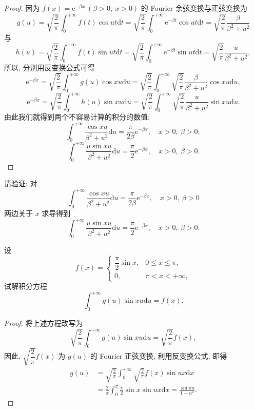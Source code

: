 \begin{proof}
因为 $f(x)=\mathrm{e}^{-\beta x}\ (\beta>0,\ x>0)$ 的 Fourier 余弦变换与正弦变换为
\[
  g(u)=\sqrt{\frac{2}{\pi}}\int_{0}^{+\infty}f(t)\cos ut\mathrm{d}t=\sqrt{\frac{2}{\pi}}\int_{0}^{+\infty}\mathrm{e}^{-\beta t}\cos ut\mathrm{d}t=\sqrt{\frac{2}{\pi}}\frac{\beta}{\beta^{2}+u^{2}}
\]
与
\[
  h(u)=\sqrt{\frac{2}{\pi}}\int_{0}^{+\infty}f(t)\sin ut\mathrm{d}t=\sqrt{\frac{2}{\pi}}\int_{0}^{+\infty}\mathrm{e}^{-\beta t}\sin ut\mathrm{d}t=\sqrt{\frac{2}{\pi}}\frac{u}{\beta^{2}+u^{2}},
\]
所以, 分别用反变换公式可得
\[
  \mathrm{e}^{-\beta x}=\sqrt{\frac{2}{\pi}}\int_{0}^{+\infty}g(u)\cos xu\mathrm{d}u=\sqrt{\frac{2}{\pi}}\int_{0}^{+\infty}\sqrt{\frac{2}{\pi}}\frac{\beta}{\beta^{2}+u^{2}}\cos xu\mathrm{d}u,
\]
\[
  \mathrm{e}^{-\beta x}=\sqrt{\frac{2}{\pi}}\int_{0}^{+\infty}h(u)\sin xu\mathrm{d}u=\sqrt{\frac{2}{\pi}}\int_{0}^{+\infty}\sqrt{\frac{2}{\pi}}\frac{u}{\beta^{2}+u^{2}}\sin xu\mathrm{d}u.
\]
由此我们就得到两个不容易计算的积分的数值:
\[
  \int_{0}^{+\infty}\frac{\cos xu}{\beta^{2}+u^{2}}\mathrm{d}u=\frac{\pi}{2\beta}\mathrm{e}^{-\beta x},\quad x>0,\ \beta>0;
\]
\[
  \int_{0}^{+\infty}\frac{u\sin xu}{\beta^{2}+u^{2}}\mathrm{d}u=\frac{\pi}{2}\mathrm{e}^{-\beta x},\quad x>0,\ \beta>0.
\]
\end{proof}

\begin{remark}\label{rem:16.3.1}
请验证: 对
\[
  \int_{0}^{+\infty}\frac{\cos xu}{\beta^{2}+u^{2}}\mathrm{d}u=\frac{\pi}{2\beta}\mathrm{e}^{-\beta x},\quad x>0,\ \beta>0
\]
两边关于 $x$ 求导得到
\[
  \int_{0}^{+\infty}\frac{u\sin xu}{\beta^{2}+u^{2}}\mathrm{d}u=\frac{\pi}{2}\mathrm{e}^{-\beta x},\quad x>0,\ \beta>0.
\]
\end{remark}

\begin{example}\label{ex:16.3.3}
设
\[
  f(x)=\begin{cases}
    \dfrac{\pi}{2}\sin x,&0\leqslant x\leqslant\pi,\\[4pt]
    0,&\pi<x<+\infty,
\end{cases}
\]
试解积分方程
\[
  \int_{0}^{+\infty}g(u)\sin xu\mathrm{d}u=f(x).
\]
\end{example}

\begin{proof}
将上述方程改写为
\[
  \sqrt{\frac{2}{\pi}}\int_{0}^{+\infty}g(u)\sin xu\mathrm{d}u=\sqrt{\frac{2}{\pi}}f(x),
\]
因此, $\sqrt{\dfrac{2}{\pi}}f(x)$ 为 $g(u)$ 的 Fourier 正弦变换, 利用反变换公式, 即得
\begin{align*}
  g(u)&=\sqrt{\frac{2}{\pi}}\int_{0}^{+\infty}\sqrt{\frac{2}{\pi}}f(x)\sin ux\mathrm{d}x\\
  &=\frac{2}{\pi}\int_{0}^{\pi}\frac{\pi}{2}\sin x\sin ux\mathrm{d}x=\frac{\sin\pi u}{1-u^{2}}.
\end{align*}
\end{proof}

